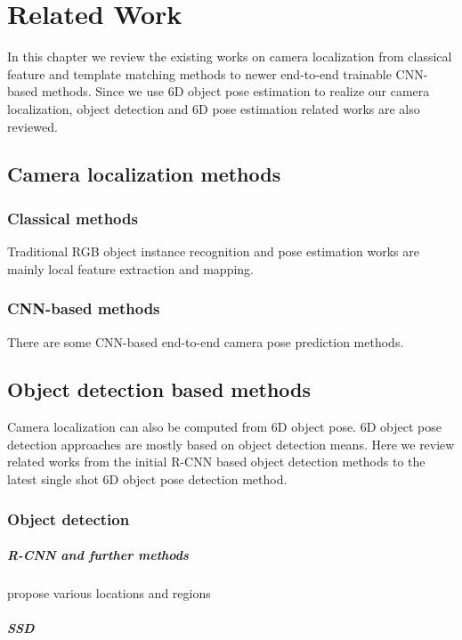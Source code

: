 \chapter{Related Work}

In this chapter we review the existing works on camera localization from classical feature and template matching methods to newer end-to-end trainable CNN-based methods. Since we use 6D object pose estimation to realize our camera localization, object detection and 6D pose estimation related works are also reviewed.

\section{Camera localization methods}

\subsection{Classical methods}

Traditional RGB object instance recognition and pose estimation works are mainly local feature extraction and mapping.

\subsection{CNN-based methods}
There are some CNN-based end-to-end camera pose prediction methods.

\section{Object detection based methods}
Camera localization can also be computed from 6D object pose. 6D object pose detection approaches are mostly based on object detection means. Here we review related works from the initial R-CNN based object detection methods to the latest single shot 6D object pose detection method.

\subsection{Object detection}

\paragraph{R-CNN and further methods}
propose various locations and regions 

\paragraph{SSD}

